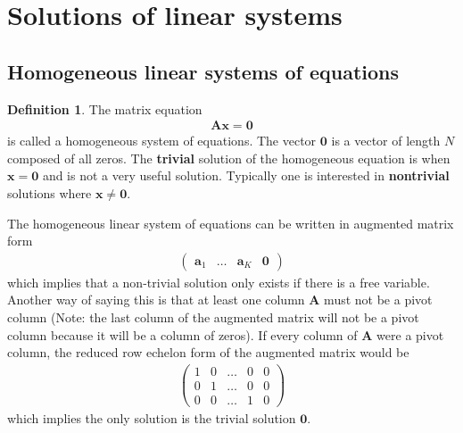 \documentclass[
]{book}
\theoremstyle{definition}
\newtheorem{definition}{Definition}[chapter]
\theoremstyle{definition}
\theoremstyle{definition}
\theoremstyle{remark}
\begin{document}
\hypertarget{solutions-of-linear-systems-1}{%
\section{Solutions of linear systems}\label{solutions-of-linear-systems-1}}

\hypertarget{homogeneous-linear-systems-of-equations}{%
\subsection{Homogeneous linear systems of equations}\label{homogeneous-linear-systems-of-equations}}

\begin{definition}
\protect\hypertarget{def:unnamed-chunk-96}{}{\label{def:unnamed-chunk-96} }The matrix equation
\[
\begin{aligned}
\mathbf{A}\mathbf{x} = \mathbf{0}
\end{aligned}
\label{eq:homogeneous}
\]
is called a homogeneous system of equations. The vector \(\mathbf{0}\) is a vector of length \(N\) composed of all zeros. The \textbf{trivial} solution of the homogeneous equation is when \(\mathbf{x} = \mathbf{0}\) and is not a very useful solution. Typically one is interested in \textbf{nontrivial} solutions where \(\mathbf{x} \neq \mathbf{0}\).
\end{definition}

The homogeneous linear system of equations can be written in augmented matrix form
\[
\begin{aligned}
\begin{pmatrix} \mathbf{a}_1 & \ldots & \mathbf{a}_K & \mathbf{0} \end{pmatrix}
\end{aligned}
\]
which implies that a non-trivial solution only exists if there is a free variable. Another way of saying this is that at least one column \(\mathbf{A}\) must not be a pivot column (Note: the last column of the augmented matrix will not be a pivot column because it will be a column of zeros). If every column of \(\mathbf{A}\) were a pivot column, the reduced row echelon form of the augmented matrix would be
\[
\begin{aligned}
\begin{pmatrix}
1 & 0 & \ldots & 0 & 0 \\
0 & 1 & \ldots & 0 & 0 \\
0 & 0 & \ldots & 1 & 0 
\end{pmatrix}
\end{aligned}
\]
which implies the only solution is the trivial solution \(\mathbf{0}\).
\end{document}
